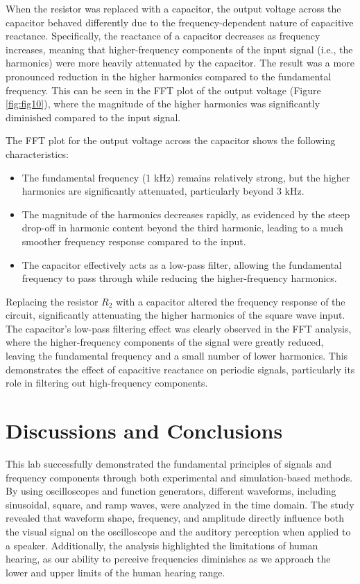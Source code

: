 \documentclass{article}
\begin{document}
When the resistor was replaced with a capacitor, the output voltage across the capacitor behaved differently 
due to the frequency-dependent nature of capacitive reactance. Specifically, the reactance of a capacitor decreases 
as frequency increases, meaning that higher-frequency components of the input signal (i.e., the harmonics) were more 
heavily attenuated by the capacitor. The result was a more pronounced reduction in the higher harmonics compared to the 
fundamental frequency. This can be seen in the FFT plot of the output voltage (Figure \ref{fig:fig10}), where the magnitude of the higher harmonics 
was significantly diminished compared to the input signal.
\newline

The FFT plot for the output voltage across the capacitor shows the following characteristics:
\begin{itemize}
	\item The fundamental frequency (1 kHz) remains relatively strong, but the higher harmonics are significantly attenuated, particularly beyond 3 kHz.
	\item The magnitude of the harmonics decreases rapidly, as evidenced by the steep drop-off in harmonic content beyond the third harmonic, leading to a much smoother frequency response compared to the input.
	\item The capacitor effectively acts as a low-pass filter, allowing the fundamental frequency to pass through while reducing the higher-frequency harmonics.
\end{itemize}


Replacing the resistor \(R_2\) with a capacitor altered the frequency response of the circuit, significantly 
attenuating the higher harmonics of the square wave input. The capacitor's low-pass filtering effect was clearly 
observed in the FFT analysis, where the higher-frequency components of the signal were greatly reduced, leaving 
the fundamental frequency and a small number of lower harmonics. This demonstrates the effect of capacitive reactance 
on periodic signals, particularly its role in filtering out high-frequency components.



\section{Discussions and Conclusions}
This lab successfully demonstrated the fundamental principles of signals and frequency components 
through both experimental and simulation-based methods. By using oscilloscopes and function generators, 
different waveforms, including sinusoidal, square, and ramp waves, were analyzed in the time domain. The 
study revealed that waveform shape, frequency, and amplitude directly influence both the visual signal on the 
oscilloscope and the auditory perception when applied to a speaker. Additionally, the analysis highlighted the 
limitations of human hearing, as our ability to perceive frequencies diminishes as we approach the lower and upper 
limits of the human hearing range.
\newline
\end{document}
